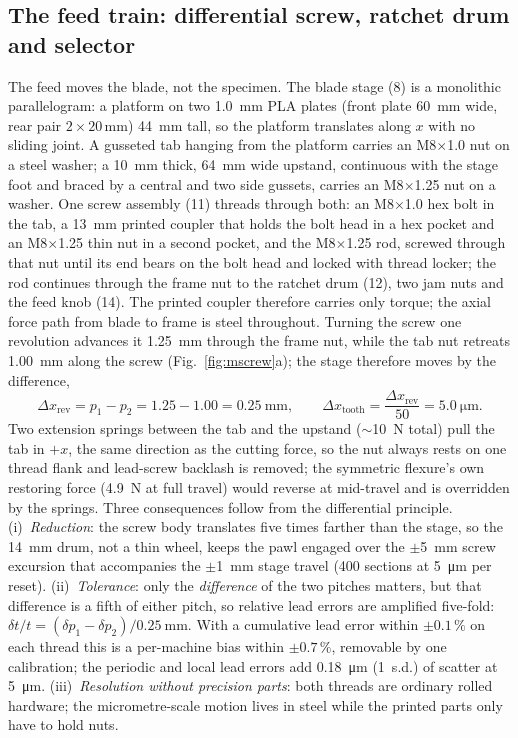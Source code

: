 \subsection{The feed train: differential screw, ratchet drum and selector}
The feed moves the blade, not the specimen. The blade stage (8) is a monolithic parallelogram: a platform on two \SI{1.0}{\milli\metre} PLA plates (front plate \SI{60}{\milli\metre} wide, rear pair $2\times20$\,mm) \SI{44}{\milli\metre} tall, so the platform translates along $x$ with no sliding joint. A gusseted tab hanging from the platform carries an M8$\times$1.0 nut on a steel washer; a \SI{10}{\milli\metre} thick, \SI{64}{\milli\metre} wide upstand, continuous with the stage foot and braced by a central and two side gussets, carries an M8$\times$1.25 nut on a washer. One screw assembly (11) threads through both: an M8$\times$1.0 hex bolt in the tab, a \SI{13}{\milli\metre} printed coupler that holds the bolt head in a hex pocket and an M8$\times$1.25 thin nut in a second pocket, and the M8$\times$1.25 rod, screwed through that nut until its end bears on the bolt head and locked with thread locker; the rod continues through the frame nut to the ratchet drum (12), two jam nuts and the feed knob (14). The printed coupler therefore carries only torque; the axial force path from blade to frame is steel throughout. Turning the screw one revolution advances it \SI{1.25}{\milli\metre} through the frame nut, while the tab nut retreats \SI{1.00}{\milli\metre} along the screw (Fig.~\ref{fig:mscrew}a); the stage therefore moves by the difference,
\begin{equation}
\Delta x_{\mathrm{rev}}=p_1-p_2=1.25-1.00=\SI{0.25}{\milli\metre},\qquad
\Delta x_{\mathrm{tooth}}=\frac{\Delta x_{\mathrm{rev}}}{50}=\SI{5.0}{\micro\metre}.
\end{equation}
Two extension springs between the tab and the upstand ($\sim$\SI{10}{\newton} total) pull the tab in $+x$, the same direction as the cutting force, so the nut always rests on one thread flank and lead-screw backlash is removed; the symmetric flexure's own restoring force (\SI{4.9}{\newton} at full travel) would reverse at mid-travel and is overridden by the springs. Three consequences follow from the differential principle. (i)~\emph{Reduction}: the screw body translates five times farther than the stage, so the \SI{14}{\milli\metre} drum, not a thin wheel, keeps the pawl engaged over the $\pm$\SI{5}{\milli\metre} screw excursion that accompanies the $\pm$\SI{1}{\milli\metre} stage travel (400 sections at \SI{5}{\micro\metre} per reset). (ii)~\emph{Tolerance}: only the \emph{difference} of the two pitches matters, but that difference is a fifth of either pitch, so relative lead errors are amplified five-fold: $\delta t/t=(\delta p_1-\delta p_2)/\SI{0.25}{\milli\metre}$. With a cumulative lead error within $\pm0.1\,\%$ on each thread this is a per-machine bias within $\pm0.7\,\%$, removable by one calibration; the periodic and local lead errors add \SI{0.18}{\micro\metre} (1~s.d.) of scatter at \SI{5}{\micro\metre}. (iii)~\emph{Resolution without precision parts}: both threads are ordinary rolled hardware; the micrometre-scale motion lives in steel while the printed parts only have to hold nuts.

